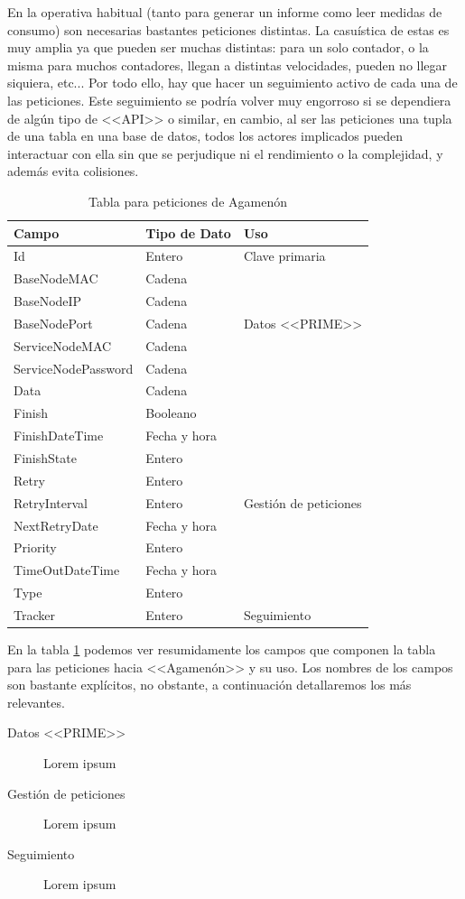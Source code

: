 En la operativa habitual (tanto para generar un informe como leer medidas de consumo) son necesarias bastantes peticiones distintas. La casuística de estas es muy amplia ya que pueden ser muchas distintas: para un solo contador, o la misma para muchos contadores, llegan a distintas velocidades, pueden no llegar siquiera, etc... Por todo ello, hay que hacer un seguimiento activo de cada una de las peticiones. Este seguimiento se podría volver muy engorroso si se dependiera de algún tipo de <<API>> o similar, en cambio, al ser las peticiones una tupla de una tabla en una base de datos, todos los actores implicados pueden interactuar con ella sin que se perjudique ni el rendimiento o la complejidad, y además evita colisiones.

\begin{table}[hb]
	\centering
	\begin{tabular}{lll}
		\toprule
		Campo & Tipo de Dato & Uso\\ \toprule
		Id & Entero & Clave primaria \\ \cline{3-3}
		BaseNodeMAC & Cadena & \multirow{5}{*}{Datos <<PRIME>>} \\ 
		BaseNodeIP & Cadena & \\
		BaseNodePort & Cadena & \\
		ServiceNodeMAC & Cadena & \\
		ServiceNodePassword & Cadena & \\
		Data & Cadena & \\ \cline{3-3}
		Finish & Booleano & \multirow{9}{*}{Gestión de peticiones}\\
		FinishDateTime & Fecha y hora & \\
		FinishState & Entero & \\
		Retry & Entero & \\
		RetryInterval & Entero & \\
		NextRetryDate & Fecha y hora & \\
		Priority & Entero & \\
		TimeOutDateTime & Fecha y hora & \\
		Type & Entero & \\ \cline{3-3}
		Tracker & Entero & Seguimiento\\
		\bottomrule
	\end{tabular}
	\caption{Tabla para peticiones de Agamenón}
	\label{tab:DiagramaTablaAgamenon}
\end{table}

En la tabla \ref{tab:DiagramaTablaAgamenon} podemos ver resumidamente los campos que componen la tabla para las peticiones hacia <<Agamenón>> y su uso. Los nombres de los campos son bastante explícitos, no obstante, a continuación detallaremos los más relevantes.

\begin{description}
	\item[Datos <<PRIME>>] Lorem ipsum
	\item[Gestión de peticiones] Lorem ipsum
	\item[Seguimiento] Lorem ipsum
\end{description}















